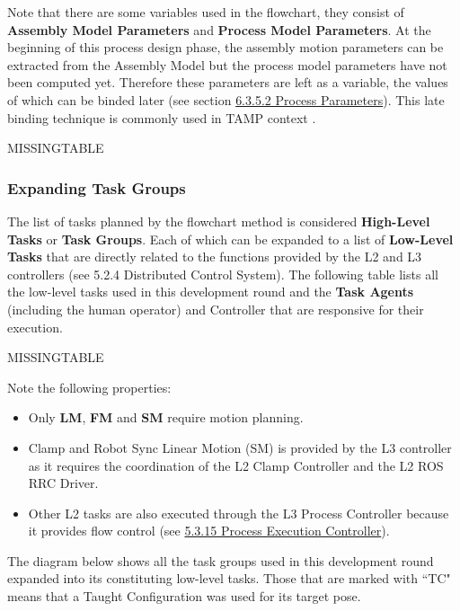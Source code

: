 Note that there are some variables used in the flowchart, they consist of \textbf{Assembly Model Parameters} and \textbf{Process Model Parameters}. At the beginning of this process design phase, the assembly motion parameters can be extracted from the Assembly Model but the process model parameters have not been computed yet. Therefore these parameters are left as a variable, the values of which can be binded later (see section \ul{6.3.5.2 Process Parameters}). This late binding technique is commonly used in TAMP context \parencite{garrettIntegratedTaskMotion2021a, lozanoperezConstraintBasedMethodSolving2014}.

MISSINGTABLE

\subsubsection{Expanding Task Groups}

The list of tasks planned by the flowchart method is considered \textbf{High-Level Tasks }or \textbf{Task Groups}. Each of which can be expanded to a list of \textbf{Low-Level Tasks} that are directly related to the functions provided by the L2 and L3 controllers (see 5.2.4 Distributed Control System). The following table lists all the low-level tasks used in this development round and the \textbf{Task Agents }(including the human operator) and Controller that are responsive for their execution.

MISSINGTABLE

Note the following properties:

\begin{itemize}
	\item Only \textbf{LM}, \textbf{FM }and \textbf{SM }require motion planning. 

	\item Clamp and Robot Sync Linear Motion (SM) is provided by the L3 controller as it requires the coordination of the L2 Clamp Controller and the L2 ROS RRC Driver. 

	\item Other L2 tasks are also executed through the L3 Process Controller because it provides flow control (see \ul{5.3.15 Process Execution Controller}). 

\end{itemize}
The diagram below shows all the task groups used in this development round expanded into its constituting low-level tasks. Those that are marked with ``TC" means that a Taught Configuration was used for its target pose.

